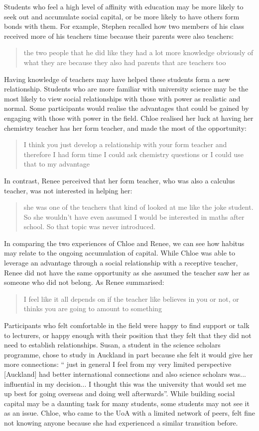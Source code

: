 Students who feel a high level of affinity with education may be more likely to seek out and accumulate social capital, or be more likely to have others form bonds with them. For example, Stephen recalled how two members of his class received more of his teachers time because their parents were also teachers: \blockquote{the two people that he did like they had a lot more knowledge obviously of what they are because they also had parents that are teachers too}. Having knowledge of teachers may have helped these students form a new relationship. Students who are more familiar with university science may be the most likely to view social relationships with those with power as realistic and normal. Some participants would realise the advantages that could be gained by engaging with those with power in the field. Chloe realised her luck at having her chemistry teacher has her form teacher, and made the most of the opportunity: \blockquote{I think you just develop a relationship with your form teacher and therefore I had form time I could ask chemistry questions or I could use that to my advantage}. In contrast, Renee perceived that her form teacher, who was also a calculus teacher, was not interested in helping her: \blockquote{she was one of the teachers that kind of looked at me like the joke student. So she wouldn't have even assumed I would be interested in maths after school. So that topic was never introduced.} In comparing the two experiences of Chloe and Renee, we can see how habitus may relate to the ongoing accumulation of capital. While Chloe was able to leverage an advantage through a social relationship with a receptive teacher, Renee did not have the same opportunity as she assumed the teacher saw her as someone who did not belong. As Renee summarised: \blockquote{I feel like it all depends on if the teacher like believes in you or not, or thinks you are going to amount to something}.

Participants who felt comfortable in the field were happy to find support or talk to lecturers, or happy enough with their position that they felt that they did not need to establish relationships. Susan, a student in the science scholars programme, chose to study in Auckland in part because she felt it would give her more connections: `` just in general I feel from my very limited perspective [Auckland] had better international connections and also science scholars was... influential in my decision... I thought this was the university that would set me up best for going overseas and doing well afterwards''. While building social capital may be a daunting task for many students, some students may not see it as an issue. Chloe, who came to the UoA with a limited network of peers, felt fine not knowing anyone because she had experienced a similar transition before. 

